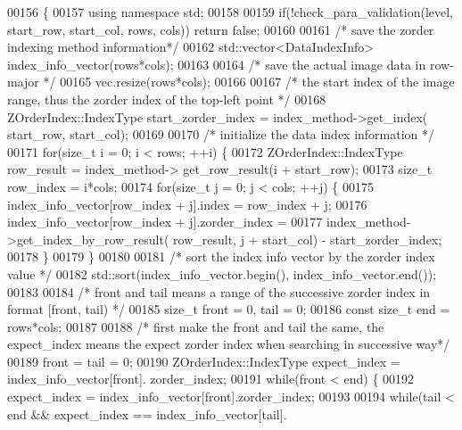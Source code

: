 \begin{DoxyCode}
00156 \{
00157         \textcolor{keyword}{using namespace }std;
00158 
00159         \textcolor{keywordflow}{if}(!check\_para\_validation(level, start\_row, start\_col, rows, cols)) \textcolor{keywordflow}{
      return} \textcolor{keyword}{false};
00160 
00161         \textcolor{comment}{/* save the zorder indexing method information*/}
00162         std::vector<DataIndexInfo> index\_info\_vector(rows*cols);
00163 
00164         \textcolor{comment}{/* save the actual image data in row-major */}
00165         vec.resize(rows*cols);
00166 
00167         \textcolor{comment}{/* the start index of the image range, thus the zorder index of the
       top-left point */}
00168         ZOrderIndex::IndexType start\_zorder\_index = index\_method->get\_index(
      start\_row, start\_col);
00169 
00170         \textcolor{comment}{/* initialize the data index information */} 
00171         \textcolor{keywordflow}{for}(\textcolor{keywordtype}{size\_t} i = 0; i < rows; ++i) \{
00172                 ZOrderIndex::IndexType row\_result = index\_method->
      get\_row\_result(i + start\_row);
00173                 \textcolor{keywordtype}{size\_t} row\_index = i*cols;      
00174                 \textcolor{keywordflow}{for}(\textcolor{keywordtype}{size\_t} j = 0; j < cols; ++j) \{
00175                         index\_info\_vector[row\_index + j].index = row\_index + j;
00176                         index\_info\_vector[row\_index + j].zorder\_index = 
00177                                 index\_method->get\_index\_by\_row\_result(
      row\_result, j + start\_col) - start\_zorder\_index; 
00178                 \}
00179         \}
00180 
00181         \textcolor{comment}{/* sort the index info vector by the zorder index value */}
00182         std::sort(index\_info\_vector.begin(), index\_info\_vector.end());
00183 
00184         \textcolor{comment}{/* front and tail means a range of the successive zorder index in
       format [front, tail) */}
00185         \textcolor{keywordtype}{size\_t} front = 0, tail = 0;
00186         \textcolor{keyword}{const} \textcolor{keywordtype}{size\_t} end = rows*cols;  
00187 
00188         \textcolor{comment}{/* first make the front and tail the same, the expect\_index means the
       expect zorder index when searching in successive way*/}
00189         front = tail = 0;
00190         ZOrderIndex::IndexType expect\_index = index\_info\_vector[front].
      zorder\_index;
00191         \textcolor{keywordflow}{while}(front < end) \{
00192                 expect\_index = index\_info\_vector[front].zorder\_index;
00193 
00194                 \textcolor{keywordflow}{while}(tail < end && expect\_index == index\_info\_vector[tail].

\end{DoxyCode}
